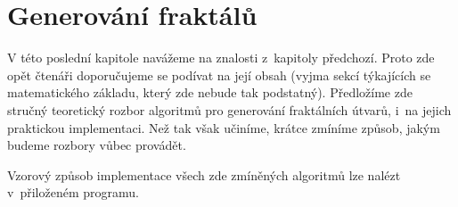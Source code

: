\chapter{Generování fraktálů}\label{chapter:generovani-fraktalu}

V této poslední kapitole navážeme na znalosti z~kapitoly předchozí. Proto zde opět čtenáři doporučujeme se podívat na její obsah (vyjma sekcí týkajících se matematického základu, který zde nebude tak podstatný). Předložíme zde stručný teoretický rozbor algoritmů pro generování fraktálních útvarů, i~na jejich praktickou implementaci. Než tak však učiníme, krátce zmíníme způsob, jakým budeme rozbory vůbec provádět.

Vzorový způsob implementace všech zde zmíněných algoritmů lze nalézt v~přiloženém programu.




